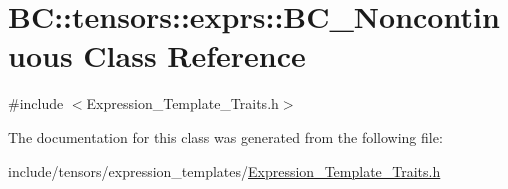 \hypertarget{classBC_1_1tensors_1_1exprs_1_1BC__Noncontinuous}{}\section{BC\+:\+:tensors\+:\+:exprs\+:\+:B\+C\+\_\+\+Noncontinuous Class Reference}
\label{classBC_1_1tensors_1_1exprs_1_1BC__Noncontinuous}


{\ttfamily \#include $<$Expression\+\_\+\+Template\+\_\+\+Traits.\+h$>$}



The documentation for this class was generated from the following file\+:\begin{DoxyCompactItemize}
\item 
include/tensors/expression\+\_\+templates/\hyperlink{Expression__Template__Traits_8h}{Expression\+\_\+\+Template\+\_\+\+Traits.\+h}\end{DoxyCompactItemize}
